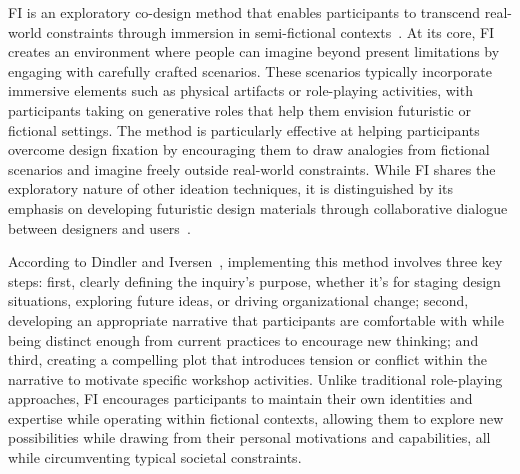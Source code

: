  FI is an exploratory co-design method that enables participants to transcend real-world constraints through immersion in semi-fictional contexts~\cite{IversenDindler-2007-FictionalInquiry--designSpace-m}. At its core, FI creates an environment where people can imagine beyond present limitations by engaging with carefully crafted scenarios. These scenarios typically incorporate immersive elements such as physical artifacts or role-playing activities, with participants taking on generative roles that help them envision futuristic or fictional settings. The method is particularly effective at helping participants overcome design fixation by encouraging them to draw analogies from fictional scenarios and imagine freely outside real-world constraints. While FI shares the exploratory nature of other ideation techniques, it is distinguished by its emphasis on developing futuristic design materials through collaborative dialogue between designers and users~\cite{IversenDindler-2007-FictionalInquiry--designSpace-m}.

According to Dindler and Iversen~\cite{IversenDindler-2007-FictionalInquiry--designSpace-m}, implementing this method involves three key steps: first, clearly defining the inquiry's purpose, whether it's for staging design situations, exploring future ideas, or driving organizational change; second, developing an appropriate narrative that participants are comfortable with while being distinct enough from current practices to encourage new thinking; and third, creating a compelling plot that introduces tension or conflict within the narrative to motivate specific workshop activities. Unlike traditional role-playing approaches, FI encourages participants to maintain their own identities and expertise while operating within fictional contexts, allowing them to explore new possibilities while drawing from their personal motivations and capabilities, all while circumventing typical societal constraints. 